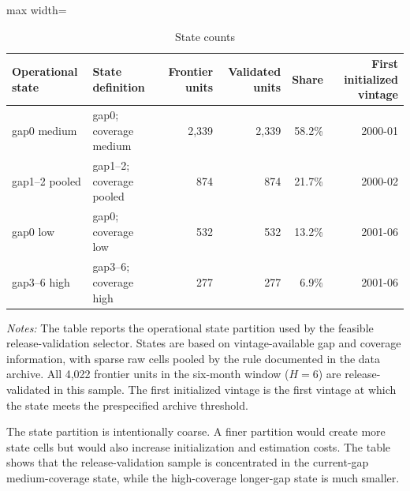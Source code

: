 \documentclass[a4paper,12pt]{article}
\newcommand{\1}{\mathbf{1}}
\newcommand{\ExhibitNote}[1]{\begin{minipage}{0.94\textwidth}\footnotesize\emph{Notes:} #1\end{minipage}}
\begin{document}
\begin{table}[H]
\centering
\caption{State counts}
\label{tab:ia_state_counts}
\small
\begin{adjustbox}{max width=\textwidth}
\begin{tabular}{@{}llrrrr@{}}
\toprule
Operational state & State definition & Frontier units & Validated units & Share & First initialized vintage \\
\midrule
gap0 medium & gap0; coverage medium & 2,339 & 2,339 & 58.2\% & 2000-01 \\
gap1--2 pooled & gap1--2; coverage pooled & 874 & 874 & 21.7\% & 2000-02 \\
gap0 low & gap0; coverage low & 532 & 532 & 13.2\% & 2001-06 \\
gap3--6 high & gap3--6; coverage high & 277 & 277 & 6.9\% & 2001-06 \\
\bottomrule
\end{tabular}
\end{adjustbox}
\par\medskip
\ExhibitNote{The table reports the operational state partition used by the feasible release-validation selector. States are based on vintage-available gap and coverage information, with sparse raw cells pooled by the rule documented in the data archive. All 4,022 frontier units in the six-month window ($H=6$) are release-validated in this sample. The first initialized vintage is the first vintage at which the state meets the prespecified archive threshold.}
\end{table}

The state partition is intentionally coarse. A finer partition would create more state cells but would also increase initialization and estimation costs. The table shows that the release-validation sample is concentrated in the current-gap medium-coverage state, while the high-coverage longer-gap state is much smaller.
\end{document}
